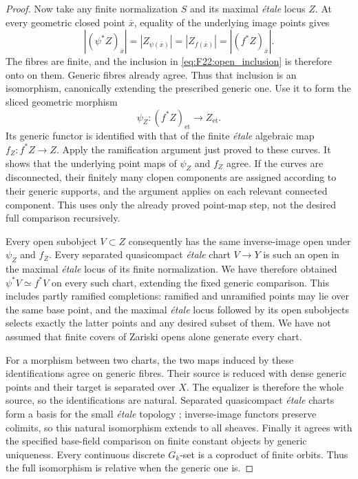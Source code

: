 \begin{proof}
Now take any finite normalization $S$ and its maximal
\emph{\'etale} locus $Z$. At every geometric closed point
$\bar x$, equality of the underlying image points gives
\[
 |(\psi^*Z)_{\bar x}|=|Z_{\psi(\bar x)}|
     =|Z_{f(\bar x)}|=|(f^*Z)_{\bar x}|.
\]
The fibres are finite, and the inclusion in
\eqref{eq:F22:open_inclusion} is therefore onto on them.
Generic fibres already agree. Thus that inclusion is an
isomorphism, canonically extending the prescribed generic one.
Use it to form the sliced geometric morphism
\[
 \psi_Z:(f^*Z)_{\mathrm{et}}\longrightarrow Z_{\mathrm{et}}.
\]
Its generic functor is identified with that of the finite
\emph{\'etale} algebraic map $f_Z:f^*Z\to Z$.
Apply the ramification argument just proved to these curves.
It shows that the underlying point maps of $\psi_Z$ and $f_Z$
agree. If the curves are disconnected, their finitely many
clopen components are assigned according to their generic
supports, and the argument applies on each relevant connected
component. This uses only the already proved point-map step,
not the desired full comparison recursively.

Every open subobject $V\subset Z$ consequently has the same
inverse-image open under $\psi_Z$ and $f_Z$. Every separated
quasicompact \emph{\'etale} chart $V\to Y$ is such an open in
the maximal \emph{\'etale} locus of its finite normalization.
We have therefore obtained $\psi^*V\simeq f^*V$ on every such
chart, extending the fixed generic comparison. This includes
partly ramified completions: ramified and unramified points may
lie over the same base point, and the maximal \emph{\'etale}
locus followed by its open subobjects selects exactly the latter
points and any desired subset of them. We have not assumed that
finite covers of Zariski opens alone generate every chart.

For a morphism between two charts, the two maps induced by these
identifications agree on generic fibres. Their source is reduced
with dense generic points and their target is separated over
$X$. The equalizer is therefore the whole source, so the
identifications are natural. Separated quasicompact
\emph{\'etale} charts form a basis for the small
\emph{\'etale} topology \citep[Lemma~A.4]{F_CHW2024};
inverse-image functors preserve colimits, so this natural
isomorphism extends to all sheaves. Finally it agrees with the
specified base-field comparison on finite constant objects by
generic uniqueness. Every continuous discrete $G_k$-set is a
coproduct of finite orbits. Thus the full isomorphism is relative
when the generic one is.
\end{proof}

